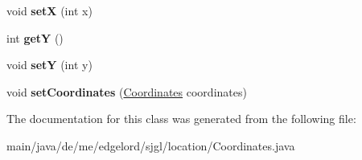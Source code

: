 \begin{DoxyCompactItemize}
void {\bfseries setX} (int x)
\item 
\mbox{\label{classde_1_1me_1_1edgelord_1_1sjgl_1_1location_1_1_coordinates_a2cbfafc705457ceb33d748890c9b45bb}} 
int {\bfseries getY} ()
\item 
\mbox{\label{classde_1_1me_1_1edgelord_1_1sjgl_1_1location_1_1_coordinates_a7a8b84f42f55b8f4edc2baa3e506a5b6}} 
void {\bfseries setY} (int y)
\item 
\mbox{\label{classde_1_1me_1_1edgelord_1_1sjgl_1_1location_1_1_coordinates_a19157e7a31293b82487f3a127fe12720}} 
void {\bfseries set\+Coordinates} (\mbox{\hyperlink{classde_1_1me_1_1edgelord_1_1sjgl_1_1location_1_1_coordinates}{Coordinates}} coordinates)
\end{DoxyCompactItemize}


The documentation for this class was generated from the following file\+:\begin{DoxyCompactItemize}
\item 
main/java/de/me/edgelord/sjgl/location/Coordinates.\+java\end{DoxyCompactItemize}

